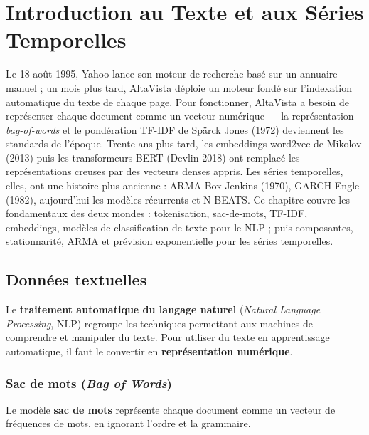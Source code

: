 \chapter{Introduction au Texte et aux S\'eries Temporelles}
\label{ch:texte_temporel}

Le 18 août 1995, Yahoo lance son moteur de recherche basé sur un annuaire manuel ; un mois plus tard, AltaVista déploie un moteur fondé sur l'indexation automatique du texte de chaque page. Pour fonctionner, AltaVista a besoin de représenter chaque document comme un vecteur numérique --- la représentation \emph{bag-of-words} et le pondération TF-IDF de Spärck Jones (1972) deviennent les standards de l'époque. Trente ans plus tard, les embeddings word2vec de Mikolov (2013) puis les transformeurs BERT (Devlin 2018) ont remplacé les représentations creuses par des vecteurs denses appris. Les séries temporelles, elles, ont une histoire plus ancienne : ARMA-Box-Jenkins (1970), GARCH-Engle (1982), aujourd'hui les modèles récurrents et N-BEATS. Ce chapitre couvre les fondamentaux des deux mondes : tokenisation, sac-de-mots, TF-IDF, embeddings, modèles de classification de texte pour le NLP ; puis composantes, stationnarité, ARMA et prévision exponentielle pour les séries temporelles.

\section{Donn\'ees textuelles}
\label{sec:donnees_textuelles}


\begin{definition}
Le \textbf{traitement automatique du langage naturel} (\textit{Natural Language Processing}, NLP) regroupe les techniques permettant aux machines de comprendre et manipuler du texte. Pour utiliser du texte en apprentissage automatique, il faut le convertir en \textbf{repr\'esentation num\'erique}.
\end{definition}

\subsection{Sac de mots (\textit{Bag of Words})}


\begin{definition}
Le mod\`ele \textbf{sac de mots} repr\'esente chaque document comme un vecteur de fr\'equences de mots, en ignorant l'ordre et la grammaire.
\end{definition}


